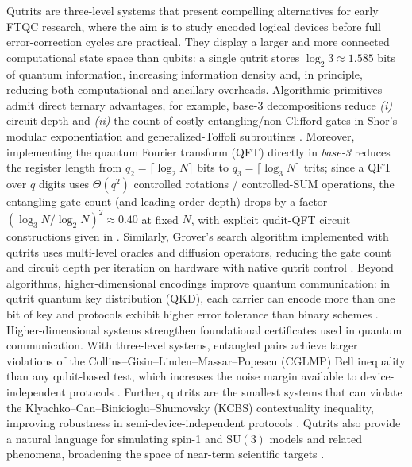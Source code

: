 Qutrits are three-level systems that present compelling alternatives for early FTQC research, where the aim is to study encoded logical devices before full error-correction cycles are practical. They display a larger and more connected computational state space than qubits: a single qutrit stores $\log_2 3 \approx 1.585$ bits of quantum information, increasing information density and, in principle, reducing both computational and ancillary overheads. Algorithmic primitives admit direct ternary advantages, for example, base-3 decompositions reduce \emph{(i)} circuit depth and \emph{(ii)} the count of costly entangling/non-Clifford gates in Shor’s modular exponentiation and generalized-Toffoli subroutines \cite{Gokhale2019}. Moreover, implementing the quantum Fourier transform (QFT) directly in \emph{base-3} reduces the register length from \(q_2=\lceil \log_2 N\rceil\) bits to \(q_3=\lceil \log_3 N\rceil\) trits; since a QFT over \(q\) digits uses \(\Theta(q^2)\) controlled rotations / controlled-\(\mathrm{SUM}\) operations, the entangling-gate count (and leading-order depth) drops by a factor \((\log_3 N/\log_2 N)^2 \approx 0.40\) at fixed \(N\), with explicit qudit-QFT circuit constructions given in \cite{PavlidisFloratos2021}. Similarly, Grover's search algorithm implemented with qutrits uses multi-level oracles and diffusion operators, reducing the gate count and circuit depth per iteration on hardware with native qutrit control \cite{Ivanov2012}. Beyond algorithms, higher-dimensional encodings improve quantum communication: in qutrit quantum key distribution (QKD), each carrier can encode more than one bit of key and protocols exhibit higher error tolerance than binary schemes \cite{BechmannPasquinucciPeres2000,Cerf2002}. Higher-dimensional systems strengthen foundational certificates used in quantum communication. With three-level systems, entangled pairs achieve larger violations of the Collins–Gisin–Linden–Massar–Popescu (CGLMP) Bell inequality than any qubit-based test, which increases the noise margin available to device-independent protocols \cite{Collins2002}. Further, qutrits are the smallest systems that can violate the Klyachko–Can–Binicioglu–Shumovsky (KCBS) contextuality inequality, improving robustness in semi-device-independent protocols \cite{Klyachko2008}. Qutrits also provide a natural language for simulating spin-1 and \(\mathrm{SU}(3)\) models and related phenomena, broadening the space of near-term scientific targets \cite{Senko2015}.
